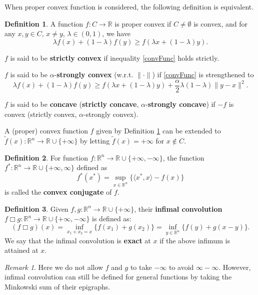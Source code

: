\documentclass[openany]{book}
\theoremstyle{definition}
\newtheorem{definition}{Definition}[chapter]
\theoremstyle{remark}
\newtheorem*{remark}{Remark}
\begin{document}
When proper convex function is considered, the following definition is equivalent.
\begin{definition}\label{def:convFunc}
A function $f:C\rightarrow\mathbb{R}$ is proper convex if $C\ne\emptyset$ is convex, and for any $x,y\in C$, $x\ne y$, $\lambda\in(0,1)$, we have
\begin{equation}\label{convFunc}
\lambda f(x)+(1-\lambda)f(y)\ge f(\lambda x+(1-\lambda)y).
\end{equation}

$f$ is said to be \textbf{strictly convex} if inequality \eqref{convFunc} holds strictly.

$f$ is said to be $\alpha$-\textbf{strongly convex} (w.r.t. $\|\cdot\|$) if \eqref{convFunc} is strengthened to
\begin{equation}
    \lambda f(x)+(1-\lambda)f(y)\ge f(\lambda x+(1-\lambda)y)+\frac{\alpha}{2}\lambda(1-\lambda)\|y-x\|^2.
\end{equation}

$f$ is said to be \textbf{concave} (\textbf{strictly concave}, $\alpha$-\textbf{strongly concave}) if $-f$ is convex (strictly convex, $\alpha$-strongly convex).
\end{definition}
A (proper) convex function $f$ given by Definition \ref{def:convFunc} can be extended to $\tilde{f}(x):\mathbb{R}^n\to \mathbb{R}\cup\{+\infty\}$ by letting $\tilde{f}(x)=+\infty$ for $x\not\in C$.

\begin{definition}\label{convConjd}
For function $f:\mathbb{R}^n\rightarrow\mathbb{R}\cup\{+\infty,-\infty\}$, the function $f^*:\mathbb{R}^n\rightarrow\mathbb{R}\cup\{+\infty,\infty\}$ defined as
\begin{equation}\label{convConj}
f^*(x^*)=\sup_{x\in \mathbb{R}^n}\{\langle x^*,x\rangle-f(x)\}
\end{equation}
is called the \textbf{convex conjugate} of $f$.
\end{definition}

\begin{definition}\label{InfConvold}
    Given $f,g:\mathbb{R}^n\rightarrow \mathbb{R}\cup\{+\infty\}$, their \textbf{infimal convolution} $f\Box g:\mathbb{R}^n\rightarrow \mathbb{R}\cup\{+\infty,-\infty\}$ is defined as:
    \begin{equation}\label{InfConvol}
        (f\Box g)(x)=\inf_{x_1+x_2=x}\{f(x_1)+g(x_2)\}=\inf_{y\in \mathbb{R}^n}\{f(y)+g(x-y)\}.
    \end{equation}
    We say that the infimal convolution is \textbf{exact} at $x$ if the above infimum is attained at $x$.
\end{definition}
\begin{remark}
    Here we do not allow $f$ and $g$ to take $-\infty$ to avoid $\infty-\infty$. However, infimal convolution can still be defined for general functions by taking the Minkowski sum of their epigraphs.
\end{remark}
\end{document}
